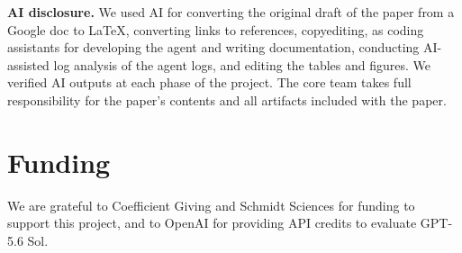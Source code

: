\textbf{AI disclosure.} We used AI for converting the original draft of the paper from a Google doc to \LaTeX, converting links to references, copyediting, as coding assistants for developing the agent and writing documentation, conducting AI-assisted log analysis of the agent logs, and editing the tables and figures. We verified AI outputs at each phase of the project. The core team takes full responsibility for the paper’s contents and all artifacts included with the paper.

\section*{Funding}

We are grateful to Coefficient Giving and Schmidt Sciences for funding to
support this project, and to OpenAI for providing API credits to evaluate GPT-5.6 Sol.
